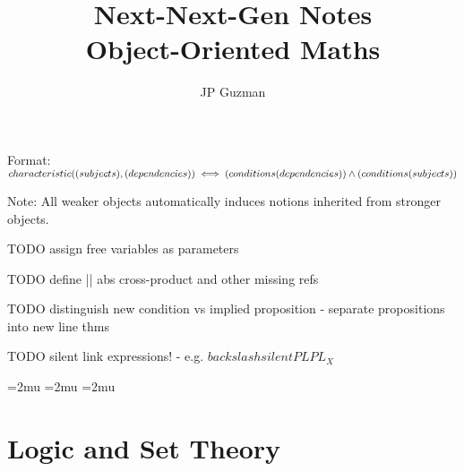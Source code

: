 \documentclass[a4paper]{article}
\title{Next-Next-Gen Notes \\
\large Object-Oriented Maths}
\author{JP Guzman}
\def\ml{\mleft}
\def\mr{\mright}
\begin{document}
\maketitle
\allowdisplaybreaks

Format: $characteristic\ml(\ml(subjects\mr), \ml(dependencies\mr)\mr) \iff \ml(conditions\ml(dependencies\mr)\mr) \land \ml(conditions\ml(subjects\mr)\mr)$

Note: All weaker objects automatically induces notions inherited from stronger objects.

TODO assign free variables as parameters

TODO define || abs  cross-product and other missing refs

TODO distinguish new condition vs implied proposition
- separate propositions into new line thms

TODO silent link expressions!
- e.g. $backslash silentPL{PL_X}$

\thinmuskip=2mu %
\medmuskip=2mu %
\thickmuskip=2mu %
\setlength{\belowdisplayskip}{0pt} \setlength{\belowdisplayshortskip}{0pt}
\setlength{\abovedisplayskip}{0pt} \setlength{\abovedisplayshortskip}{0pt}


\section{Logic and Set Theory}
\end{document}
